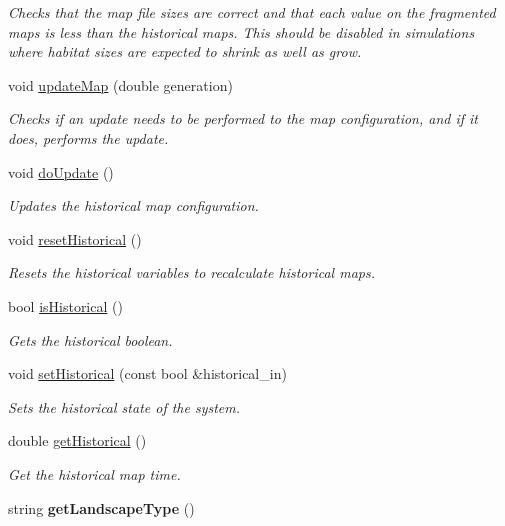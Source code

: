 \begin{DoxyCompactItemize}
\begin{DoxyCompactList}\small\item\em Checks that the map file sizes are correct and that each value on the fragmented maps is less than the historical maps. This should be disabled in simulations where habitat sizes are expected to shrink as well as grow. \end{DoxyCompactList}\item 
void \hyperlink{class_landscape_aa96c5208ad89b2e620b52f80b0937dff}{update\+Map} (double generation)
\begin{DoxyCompactList}\small\item\em Checks if an update needs to be performed to the map configuration, and if it does, performs the update. \end{DoxyCompactList}\item 
void \hyperlink{class_landscape_a1669ae6563ef5ed11ce1da30fb28214b}{do\+Update} ()\hypertarget{class_landscape_a1669ae6563ef5ed11ce1da30fb28214b}{}\label{class_landscape_a1669ae6563ef5ed11ce1da30fb28214b}

\begin{DoxyCompactList}\small\item\em Updates the historical map configuration. \end{DoxyCompactList}\item 
void \hyperlink{class_landscape_a03e35a3a42e40a683be01e75413d30d2}{reset\+Historical} ()
\begin{DoxyCompactList}\small\item\em Resets the historical variables to recalculate historical maps. \end{DoxyCompactList}\item 
bool \hyperlink{class_landscape_ab302f8a4ae779d20df94cb2525187cac}{is\+Historical} ()
\begin{DoxyCompactList}\small\item\em Gets the historical boolean. \end{DoxyCompactList}\item 
void \hyperlink{class_landscape_a7b1c5459e1ecf8d11c1dd12299a53c61}{set\+Historical} (const bool \&historical\+\_\+in)
\begin{DoxyCompactList}\small\item\em Sets the historical state of the system. \end{DoxyCompactList}\item 
double \hyperlink{class_landscape_a6b15e6748d7d776deaa489e618750983}{get\+Historical} ()
\begin{DoxyCompactList}\small\item\em Get the historical map time. \end{DoxyCompactList}\item 
string {\bfseries get\+Landscape\+Type} ()\hypertarget{class_landscape_a5dec397270e8278478f807660e43d565}{}\label{class_landscape_a5dec397270e8278478f807660e43d565}


\end{DoxyCompactItemize}
